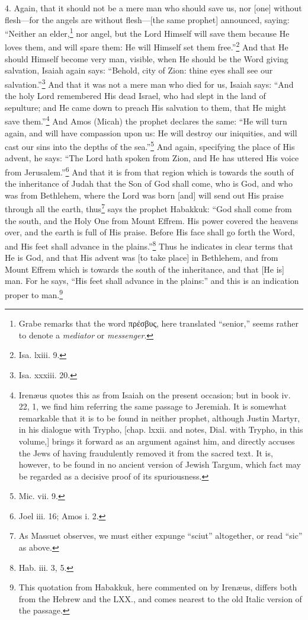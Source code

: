 4. Again, that it should not be a mere man who should save us, nor [one] without flesh—for the angels are without flesh—[the same  prophet] announced, saying: “Neither an elder,\footnote{Grabe remarks that the word \textgreek{πρέσβυς}, here translated “senior,” seems rather to denote a \emph{mediator} or \emph{messenger}.} nor angel, but the Lord Himself will save them because He loves them, and will spare them: He will Himself set them free.”\footnote{Isa. lxiii. 9.} And that He should Himself become very man, visible, when He should be the Word giving salvation, Isaiah again says: “Behold, city of Zion: thine eyes shall see our salvation.”\footnote{Isa. xxxiii. 20.} And that it was not a mere man who died for us, Isaiah says: “And the holy Lord remembered His dead Israel, who had slept in the land of sepulture; and He came down to preach His salvation to them, that He might save them.”\footnote{Irenæus quotes this as from Isaiah on the present occasion; but in book iv. 22, 1, we find him referring the same passage to Jeremiah. It is somewhat remarkable that it is to be found in neither prophet, although Justin Martyr, in his dialogue with Trypho, [chap. lxxii. and notes, Dial. with Trypho, in this volume,] brings it forward as an argument against him, and directly accuses the Jews of having fraudulently removed it from the sacred text. It is, however, to be found in no ancient version of Jewish Targum, which fact may be regarded as a decisive proof of its spuriousness.} And Amos (Micah) the prophet declares the same: “He will turn again, and will have compassion upon us: He will destroy our iniquities, and will cast our sins into the depths of the sea.”\footnote{Mic. vii. 9.} And again, specifying the place of His advent, he says: “The Lord hath spoken from Zion, and He has uttered His voice from Jerusalem.”\footnote{Joel iii. 16; Amos i. 2.} And that it is from that region which is towards the south of the inheritance of Judah that the Son of God shall come, who is God, and who was from Bethlehem, where the Lord was born [and] will send out His praise through all the earth, thus\footnote{As Massuet observes, we must either expunge “sciut” altogether, or read “sic” as above.} says the prophet Habakkuk: “God shall come from the south, and the Holy One from Mount Effrem. His power covered the heavens over, and the earth is full of His praise. Before His face shall go forth the Word, and His feet shall advance in the plains.”\footnote{Hab. iii. 3, 5.} Thus he indicates in clear terms that He is God, and that His advent was [to take place] in Bethlehem, and from Mount Effrem which is towards the south of the inheritance, and that [He is] man. For he says, “His feet shall advance in the plains:” and this is an indication proper to man.\footnote{This quotation from Habakkuk, here commented on by Irenæus, differs both from the Hebrew and the LXX., and comes nearest to the old Italic version of the passage.}

